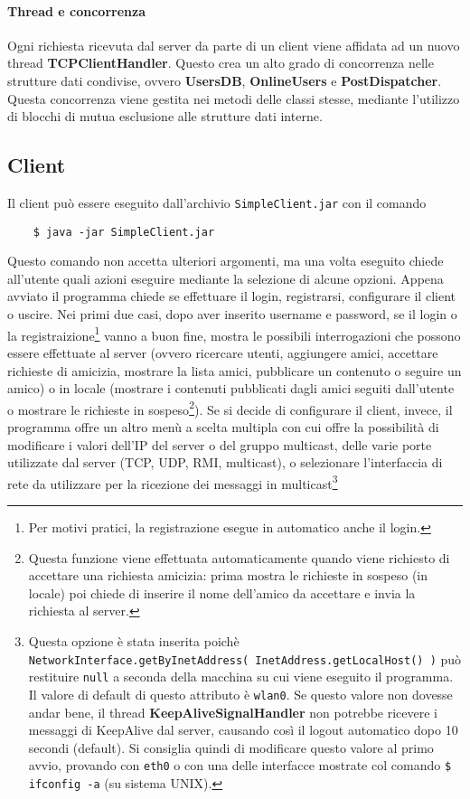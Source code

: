 \documentclass[11pt]{article}
\begin{document}
\paragraph{Thread e concorrenza} Ogni richiesta ricevuta dal server da parte di
un client viene affidata ad un nuovo thread {\bf TCPClientHandler}. Questo crea
un alto grado di concorrenza nelle strutture dati condivise, ovvero
{\bf UsersDB}, {\bf OnlineUsers} e {\bf PostDispatcher}. Questa concorrenza
viene gestita nei metodi delle classi stesse, mediante l'utilizzo di blocchi di
mutua esclusione alle strutture dati interne.

\subsection{Client}
Il client può essere eseguito dall'archivio {\tt SimpleClient.jar} con il
comando

\begin{verbatim}
	$ java -jar SimpleClient.jar
\end{verbatim}

Questo comando non accetta ulteriori argomenti, ma una volta eseguito chiede
all'utente quali azioni eseguire mediante la selezione di alcune opzioni.
Appena avviato il programma chiede se effettuare il login, registrarsi,
configurare il client o uscire. Nei primi due casi, dopo aver inserito username
e password, se il login o la registraizione\footnote{Per motivi pratici, la
registrazione esegue in automatico anche il login.} vanno a buon fine, mostra le
possibili interrogazioni che possono essere effettuate al server (ovvero
ricercare utenti, aggiungere amici, accettare richieste di amicizia, mostrare la
lista amici, pubblicare un contenuto o seguire un amico) o in locale (mostrare i
contenuti pubblicati dagli amici seguiti dall'utente o mostrare le richieste in
sospeso\footnote{Questa funzione viene effettuata automaticamente quando viene
richiesto di accettare una richiesta amicizia: prima mostra le richieste in
sospeso (in locale) poi chiede di inserire il nome dell'amico da accettare e
invia la richiesta al server.}). Se si decide di configurare il client, invece,
il programma offre un altro menù a scelta multipla con cui offre la possibilità
di modificare i valori dell'IP del server o del gruppo multicast, delle varie
porte utilizzate dal server (TCP, UDP, RMI, multicast), o selezionare
l'interfaccia di rete da utilizzare per la ricezione dei messaggi in
multicast\footnote{Questa opzione è stata inserita poichè
{\tt NetworkInterface.getByInetAddress( InetAddress.getLocalHost() )} può
restituire {\tt null} a seconda della macchina su cui viene eseguito il
programma. Il valore di default di questo attributo è {\tt wlan0}. Se questo
valore non dovesse andar bene, il thread {\bf KeepAliveSignalHandler} non
potrebbe ricevere i messaggi di KeepAlive dal server, causando così il logout
automatico dopo 10 secondi (default). Si consiglia quindi di modificare questo
valore al primo avvio, provando con {\tt eth0} o con una delle interfacce
mostrate col comando {\tt \$ ifconfig -a} (su sistema UNIX).}
\end{document}
